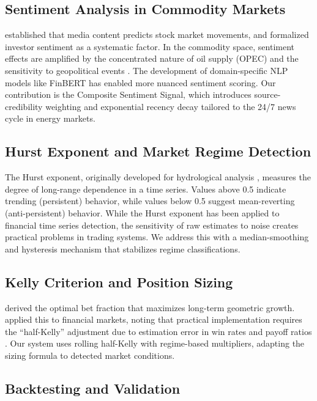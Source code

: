 \documentclass[12pt,a4paper]{article}
\begin{document}
\subsection{Sentiment Analysis in Commodity Markets}

\citet{tetlock2007giving} established that media content predicts stock market movements, and \citet{baker2007investor} formalized investor sentiment as a systematic factor. In the commodity space, sentiment effects are amplified by the concentrated nature of oil supply (OPEC) and the sensitivity to geopolitical events \citep{kilian2009not, hamilton2009oil}. The development of domain-specific NLP models like FinBERT \citep{araci2019finbert, devlin2019bert} has enabled more nuanced sentiment scoring. Our contribution is the Composite Sentiment Signal, which introduces source-credibility weighting and exponential recency decay tailored to the 24/7 news cycle in energy markets.

\subsection{Hurst Exponent and Market Regime Detection}

The Hurst exponent, originally developed for hydrological analysis \citep{hurst1951long, mandelbrot1968noah}, measures the degree of long-range dependence in a time series. Values above 0.5 indicate trending (persistent) behavior, while values below 0.5 suggest mean-reverting (anti-persistent) behavior. While the Hurst exponent has been applied to financial time series detection, the sensitivity of raw estimates to noise creates practical problems in trading systems. We address this with a median-smoothing and hysteresis mechanism that stabilizes regime classifications.

\subsection{Kelly Criterion and Position Sizing}

\citet{kelly1956new} derived the optimal bet fraction that maximizes long-term geometric growth. \citet{thorp2006kelly} applied this to financial markets, noting that practical implementation requires the ``half-Kelly'' adjustment due to estimation error in win rates and payoff ratios \citep{peters2006optimal}. Our system uses rolling half-Kelly with regime-based multipliers, adapting the sizing formula to detected market conditions.

\subsection{Backtesting and Validation}
\end{document}
